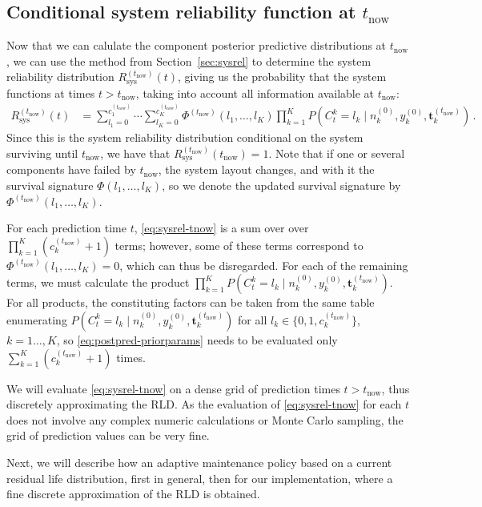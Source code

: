 \documentclass[authoryear]{elsarticle}
\renewcommand{\vec}[1]{{\bm#1}}
\newcommand{\uz}{^{(0)}} %
\def\ykz{y\uz_k}
\def\nkz{n\uz_k}
\def\tnow{t_\text{now}}
\newcommand{\Rsysnow}{R^{(t_\text{now})}_\text{sys}}
\def\cknow{c_k^{(\tnow)}}
\def\vectknow{\vec{t}_k^{(\tnow)}}
\def\Phinow{\Phi^{(\tnow)}}
\begin{document}
\subsection{Conditional system reliability function at $\tnow$}
\label{sec:sysreltnow}

Now that we can calulate the component posterior predictive distributions at $\tnow$,
we can use the method from Section~\ref{sec:sysrel}
to determine the system reliability distribution $\Rsysnow(t)$,
giving us the probability that the system functions at times $t > \tnow$,
taking into account all information available at $\tnow$:
\begin{align}
\Rsysnow(t) &= \sum_{l_1=0}^{c_1^{(\tnow)}} \cdots \sum_{l_K=0}^{c_K^{(\tnow)}} \Phinow(l_1,\ldots,l_K)
               \prod_{k=1}^K P(C^k_t = l_k\mid\nkz,\ykz, \vectknow)\,.
\label{eq:sysrel-tnow}
\end{align}
Since this is the system reliability distribution conditional on the system surviving until $\tnow$,
we have that $\Rsysnow(\tnow) = 1$.
Note that if one or several components have failed by $\tnow$,
the system layout changes, and with it the survival signature $\Phi(l_1,\ldots,l_K)$,
so we denote the updated survival signature by $\Phinow(l_1,\ldots,l_K)$.

For each prediction time $t$,
\eqref{eq:sysrel-tnow} is a sum over over $\prod_{k=1}^K (\cknow + 1)$ terms;
however, some of these terms correspond to $\Phinow(l_1,\ldots,l_K) = 0$,
which can thus be disregarded.
For each of the remaining terms,
we must calculate the product $\prod_{k=1}^K P(C^k_t = l_k\mid\nkz,\ykz, \vectknow)$.
For all products, the constituting factors can be taken from the same table
enumerating $P(C^k_t = l_k\mid\nkz,\ykz, \vectknow)$ for all $l_k \in \{0, 1, \cknow\}$, $k=1\ldots,K$,
so \eqref{eq:postpred-priorparams} needs to be evaluated 
only $\sum_{k=1}^K (\cknow + 1)$ times.

We will evaluate \eqref{eq:sysrel-tnow} on a dense grid of prediction times $t > \tnow$,
thus discretely approximating the RLD.
As the evaluation of \eqref{eq:sysrel-tnow} for each $t$ does not involve any complex numeric calculations or Monte Carlo sampling,
the grid of prediction values can be very fine.

Next, we will describe how an adaptive maintenance policy based on %
a current residual life distribution,
first in general, then for our implementation,
where a fine discrete approximation of the RLD is obtained.
\end{document}
